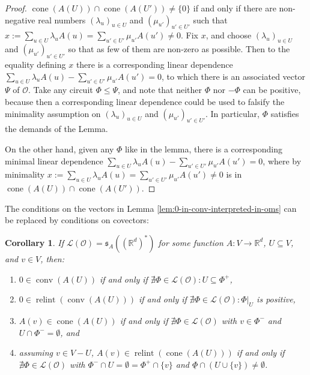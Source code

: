 \documentclass[a4paper,11pt,reqno, english]{amsart}
\newtheorem{corollary}[theorem]{Corollary}
\theoremstyle{definition}
\theoremstyle{remark}
\newcommand\R{\mathbb R}
\DeclareMathOperator{\cone}{\mathrm{cone}}
\DeclareMathOperator{\relint}{\mathrm{relint}}
\DeclareMathOperator{\conv}{\mathrm{conv}}
\begin{document}
\begin{proof}
    $\cone(A(U))\cap\cone(A(U'))\neq\{0\}$ if and only if there are non-negative real numbers $(\lambda_u)_{u\in U}$ and $(\mu_{u'})_{u'\in U'}$ such that $x:=\sum_{u\in U}\lambda_uA(u)=\sum_{u'\in U'}\mu_{u'}A(u')\neq 0$. Fix $x$, and choose $(\lambda_u)_{u\in U}$ and $(\mu_{u'})_{u'\in U'}$ so that as few of them are non-zero as possible. Then to the equality defining $x$ there is a corresponding linear dependence $\sum_{u\in U}\lambda_uA(u)-\sum_{u'\in U'}\mu_{u'}A(u')=0$, to which there is an associated vector $\Psi$ of $\mathscr{O}$. Take any circuit $\Phi\leq\Psi$, and note that neither $\Phi$ nor $-\Phi$ can be positive, because then a corresponding linear dependence could be used to falsify the minimality assumption on $(\lambda_u)_{u\in U}$ and $(\mu_{u'})_{u'\in U'}$. In particular, $\Phi$ satisfies the demands of the Lemma.

    On the other hand, given any $\Phi$ like in the lemma, there is a corresponding minimal linear dependence $\sum_{u\in U}\lambda_uA(u)-\sum_{u'\in U'}\mu_{u'}A(u')=0$, where by minimality $x:=\sum_{u\in U}\lambda_uA(u)=\sum_{u'\in U'}\mu_{u'}A(u')\neq 0$ is in $\cone(A(U)) \cap\cone(A(U'))$.
\end{proof}
The conditions on the vectors in Lemma \ref{lem:0-in-conv-interpreted-in-oms} can be replaced by conditions on covectors:
\begin{corollary}\label{crl:0-in-conv-interpreted-in-oms}
    If $\mathscr{L}(\mathscr{O})=\mathfrak{s}_A((\R^d)^*)$ for some function $A\colon V\to\R^d$, $U\subseteq V$, and $v\in V$, then:
    \begin{enumerate}[label=\normalfont{(\arabic*)}]
        \item\label{crl:0-in-conv-interpreted-in-oms:full} $0\in\conv(A(U))$ if and only if $\nexists\Phi\in\mathscr{L}(\mathscr{O})\colon U\subseteq\Phi^+$,
        \item\label{crl:0-in-conv-interpreted-in-oms:relint} $0\in\relint(\conv(A(U)))$ if and only if $\nexists\Phi\in\mathscr{L}(\mathscr{O})\colon\Phi|_U$ is positive,
        \item\label{crl:0-in-conv-interpreted-in-oms:cone} $A(v)\in\cone(A(U))$ if and only if $\nexists\Phi\in\mathscr{L}(\mathscr{O})$ with $v\in\Phi^-$ and $U\cap\Phi^-=\emptyset$, and
        \item\label{crl:0-in-conv-interpreted-in-oms:relintcone} assuming $v\in V-U$, $A(v)\in\relint(\cone(A(U)))$ if and only if $\nexists\Phi\in\mathscr{L}(\mathscr{O})$ with $\Phi^-\cap U=\emptyset=\Phi^+\cap\{v\}$ and $\underline{\Phi}\cap (U\cup\{v\})\neq\emptyset$.
    \end{enumerate}
\end{corollary}
\end{document}

